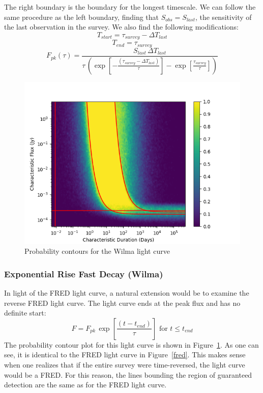 \documentclass[12pt]{article}
\begin{document}
The right boundary is the boundary for the longest timescale. We can follow the same procedure as the left boundary, finding that $S_{obs} = S_{last}$, the sensitivity of the last observation in the survey. We also find the following modifications:
\[T_{start} = \tau_{survey}  - \Delta T_{last}\]
\[T_{end} = \tau_{survey}\]
\[F_{pk}(\tau) = \frac{S_{last}\,\Delta T_{last}}{\tau\,\left(\exp\left[-\frac{(\tau_{survey} - \Delta T_{last})}{\tau}\right] - \exp\left[\frac{\tau_{survey}}{\tau}\right]\right)}\]

\begin{figure}
\includegraphics[width=\columnwidth]{wilma.png}
\caption{Probability contours for the Wilma light curve}
\label{wilma}
 \end{figure}
 
\subsubsection{Exponential Rise Fast Decay (Wilma)}
In light of the FRED light curve, a natural extension would be to examine the reverse FRED light curve. The light curve ends at the peak flux and has no definite start:
\[F=F_{pk}\,\exp\left[{\frac{(t-t_{end})}{\tau}}\right]\text{ for }t\le t_{end}\]
The probability contour plot for this light curve is shown in Figure~\ref{wilma}. As one can see, it is identical to the FRED light curve in Figure~\ref{fred}. This makes sense when one realizes that if the entire survey were time-reversed, the light curve would be a FRED. For this reason, the lines bounding the region of guaranteed detection are the same as for the FRED light curve. 
\end{document}
